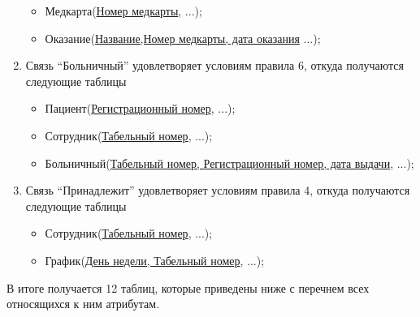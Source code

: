 \documentclass[14pt,a4paper,russian]{extreport}
\begin{document}
\begin{enumerate}[noitemsep]
\begin{itemize}[noitemsep]
            \item Медкарта(\underline{Номер медкарты}, ...);
            \item Оказание(\underline{Название,Номер медкарты, дата оказания} ...);
        \end{itemize}
    \item Связь ``Больничный'' удовлетворяет условиям правила 6, откуда получаются следующие
        таблицы
	\begin{itemize}[noitemsep]
            \item Пациент(\underline{Регистрационный номер}, ...);
            \item Сотрудник(\underline{Табельный номер}, ...);
            \item Больничный(\underline{Табельный номер, Регистрационный номер, дата выдачи}, ...);
        \end{itemize}
    \item Связь ``Принадлежит'' удовлетворяет условиям правила 4, откуда получаются следующие
        таблицы
	\begin{itemize}[noitemsep]
            \item Сотрудник(\underline{Табельный номер}, ...);
            \item График(\underline{День недели, Табельный номер}, ...);
        \end{itemize}
\end{enumerate}
В итоге получается 12 таблиц, которые приведены ниже с перечнем всех относящихся к ним атрибутам.
\end{document}
